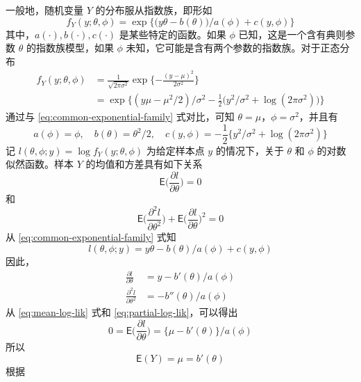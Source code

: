 \documentclass[12pt,a4paper,UTF8,twoside]{book}
\theoremstyle{definition}
\theoremstyle{definition}
\theoremstyle{definition}
\theoremstyle{remark}
\begin{document}
一般地，随机变量 \(Y\) 的分布服从指数族，即形如 \begin{equation}
f_{Y}(y;\theta,\phi) = \exp\big\{ \big(y\theta - b(\theta) \big)/a(\phi) + c(y,\phi) \big\}
\label{eq:common-exponential-family}
\end{equation} \noindent 其中，\(a(\cdot),b(\cdot),c(\cdot)\)
是某些特定的函数。如果 \(\phi\) 已知，这是一个含有典则参数 \(\theta\)
的指数族模型，如果 \(\phi\)
未知，它可能是含有两个参数的指数族。对于正态分布 \begin{equation}
\begin{aligned}
f_{Y}(y;\theta,\phi) & = \frac{1}{\sqrt{2\pi\sigma^2}} \exp\{-\frac{(y - \mu)^2}{2\sigma^2}  \}  \\
 & = \exp\big \{ (y\mu - \mu^2/2)/\sigma^2 - \frac{1}{2}\big(y^2/\sigma^2 + \log(2\pi\sigma^2)\big) \big\}
\end{aligned} \label{eq:normal-distribution}
\end{equation} \noindent 通过与 \eqref{eq:common-exponential-family}
式对比，可知 \(\theta = \mu\)，\(\phi = \sigma^2\)，并且有 \[
a(\phi) = \phi, \quad b(\theta) = \theta^2/2, \quad c(y,\phi) = - \frac{1}{2}\{ y^2/\sigma^2 + \log(2\pi\sigma^2) \} 
\] \noindent 记 \(l(\theta,\phi;y) = \log f_{Y}(y;\theta,\phi)\)
为给定样本点 \(y\) 的情况下，关于 \(\theta\) 和 \(\phi\)
的对数似然函数。样本 \(Y\) 的均值和方差具有如下关系
\citep{McCullagh1989} \begin{equation}
\mathsf{E}\big( \frac{\partial l}{\partial \theta} \big) = 0
\label{eq:mean-log-lik}
\end{equation} \noindent 和 \begin{equation}
\mathsf{E}\big( \frac{\partial^2 l}{\partial \theta^2} \big) + \mathsf{E}\big(\frac{\partial l}{\partial \theta}\big)^2  = 0
\label{eq:variance-log-lik}
\end{equation} \noindent 从 \eqref{eq:common-exponential-family} 式知
\[ l(\theta,\phi;y) = {y\theta - b(\theta)}/a(\phi) + c(y,\phi) \]
\noindent 因此， \begin{equation}
\begin{aligned}
\frac{\partial l}{\partial \theta} & = {y - b'(\theta)}/a(\phi)  \\
\frac{\partial^2 l}{\partial \theta^2}  & = - b''(\theta)/a(\phi)
\end{aligned} \label{eq:partial-log-lik}
\end{equation} \noindent 从 \eqref{eq:mean-log-lik} 式和
\eqref{eq:partial-log-lik}，可以得出 \[ 
0 = \mathsf{E}\big( \frac{\partial l}{\partial \theta} \big) = \big\{ \mu - b'(\theta) \big\}/a(\phi)
\] \noindent 所以 \[ \mathsf{E}(Y) = \mu = b'(\theta) \] \noindent 根据
\end{document}
